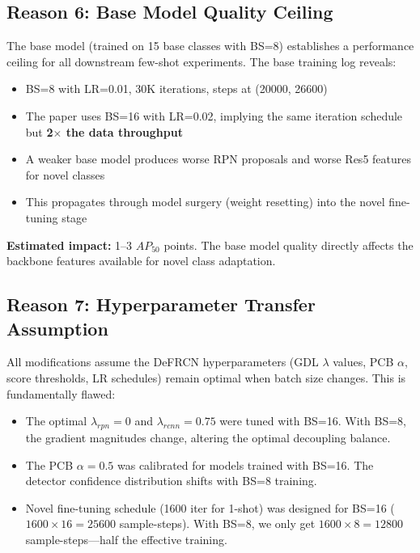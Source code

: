 \documentclass[11pt,a4paper]{article}
\begin{document}
\subsection{Reason 6: Base Model Quality Ceiling}

The base model (trained on 15 base classes with BS=8) establishes a performance ceiling for all downstream few-shot experiments. The base training log reveals:
\begin{itemize}[nosep]
    \item BS=8 with LR=0.01, 30K iterations, steps at (20000, 26600)
    \item The paper uses BS=16 with LR=0.02, implying the same iteration schedule but \textbf{2$\times$ the data throughput}
    \item A weaker base model produces worse RPN proposals and worse Res5 features for novel classes
    \item This propagates through model surgery (weight resetting) into the novel fine-tuning stage
\end{itemize}

\textbf{Estimated impact:} 1--3 $AP_{50}$ points. The base model quality directly affects the backbone features available for novel class adaptation.

\subsection{Reason 7: Hyperparameter Transfer Assumption}

All modifications assume the DeFRCN hyperparameters (GDL $\lambda$ values, PCB $\alpha$, score thresholds, LR schedules) remain optimal when batch size changes. This is fundamentally flawed:

\begin{itemize}[nosep]
    \item The optimal $\lambda_{rpn}=0$ and $\lambda_{rcnn}=0.75$ were tuned with BS=16. With BS=8, the gradient magnitudes change, altering the optimal decoupling balance.
    \item The PCB $\alpha=0.5$ was calibrated for models trained with BS=16. The detector confidence distribution shifts with BS=8 training.
    \item Novel fine-tuning schedule (1600 iter for 1-shot) was designed for BS=16 ($1600 \times 16 = 25600$ sample-steps). With BS=8, we only get $1600 \times 8 = 12800$ sample-steps---half the effective training.
\end{itemize}
\end{document}
